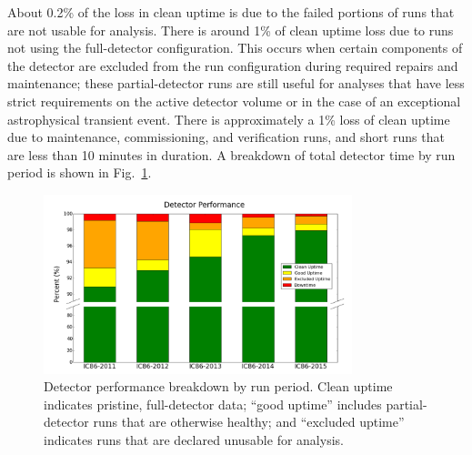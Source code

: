 About 0.2\% of the loss in clean uptime is due to the failed portions of
runs that are not usable for analysis.  There is around 1\% of clean
uptime loss due to runs not using the full-detector configuration. This
occurs when certain components of the detector are excluded from the run
configuration during required repairs and maintenance; these
partial-detector runs are still useful for analyses that have less strict
requirements on the active detector volume or in the case of an exceptional
astrophysical transient event. There is approximately a 1\%
loss of clean uptime due to maintenance, commissioning, and verification
runs, and short runs that are less than 10 minutes in duration.  A
breakdown of total detector time by run period is shown in
Fig.~\ref{fig:period-performance}.  

\begin{figure}[!ht]
	\centering
    \includegraphics[width=0.8\textwidth]{graphics/uptime/bar-chart-broken-v2.pdf}
	\caption{Detector performance breakdown by
      run period.  Clean uptime indicates pristine, full-detector
      data; ``good uptime'' includes partial-detector runs that are
      otherwise healthy; and 
    ``excluded uptime'' indicates runs that are declared unusable for
      analysis.}
    \label{fig:period-performance}
\end{figure}


